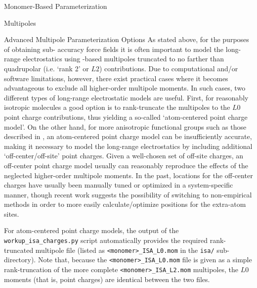 \begin{section}{Monomer-Based Parameterization}
\begin{subsection}{Multipoles}
\begin{subsubsection}{Advanced Multipole Parameterization Options}
As stated above, for the purposes of obtaining sub-\kjmol{} accuracy
force fields it is often important to model the long-range electrostatics
using \isa-based multipoles truncated to no farther than quadrupolar (i.e. `rank 2' or
$L2$)\cite{stone2013theory} contributions.
Due to computational and/or software limitations, however, there exist
practical cases where it becomes advantageous to exclude all higher-order
multipole moments.\cite{Cardamone2014} In such cases, 
two different types of long-range electrostatic models are useful. First, for
reasonably isotropic molecules a good option is to rank-truncate the \isa
multipoles to the $L0$ point charge contributions, thus yielding a so-called `atom-centered
point charge model'. On the other hand, for more anisotropic functional groups such as those
described in , an atom-centered point charge model can be
insufficiently accurate, making it 
necessary to model the long-range electrostatics by including additional 
`off-center/off-site' point charges. Given a well-chosen set of off-site charges, 
an off-center point charge model usually can reasonably reproduce the effects of the
neglected higher-order multipole moments.\cite{Dixon1997}
In the past, locations for the off-center charges have usually been manually tuned or optimized
in a system-specific manner, though recent work suggests the
possibility of switching to non-empirical methods in order to more easily calculate/optimize 
positions for the extra-atom sites.\cite{Chaudret2013,Unke2017} 

For atom-centered point charge models, the output of the
\verb|workup_isa_charges.py| script automatically provides the required
rank-truncated multipole file (listed as \verb|<monomer>_ISA_L0.mom| in the \verb|isa/|
sub-directory). Note that, because the \verb|<monomer>_ISA_L0.mom| file is given as a
simple rank-truncation of the more complete \verb|<monomer>_ISA_L2.mom|
multipoles, the $L0$ moments (that is, point charges) are identical between the two files.


\end{subsubsection}
\end{subsection}
\end{section}

